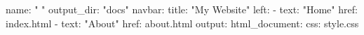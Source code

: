 name: " "
output_dir: "docs"
navbar:
  title: "My Website"
  left:
    - text: "Home"
      href: index.html
    - text: "About"
      href: about.html
output:
  html_document:
    css: style.css
